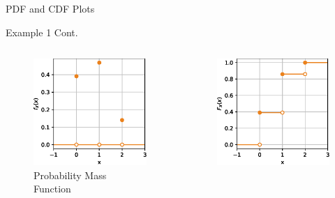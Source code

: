 \documentclass[10pt]{beamer}
\begin{document}
\begin{frame}[fragile]{PDF and CDF Plots}
\begin{exampleblock}{Example 1 Cont.}
\begin{columns}
\begin{column}{0.5\textwidth}
\begin{figure}
    \centering
    \includegraphics[width=\textwidth]{pmf.eps}
    \caption{Probability Mass Function \phantom{dummy}}
\end{figure}
\end{column}
\begin{column}{0.5\textwidth}
\begin{figure}
    \centering
    \includegraphics[width=\textwidth]{cdf.eps}

\end{figure}
\end{column}
\end{columns}
\end{exampleblock}
\end{frame}
\end{document}
